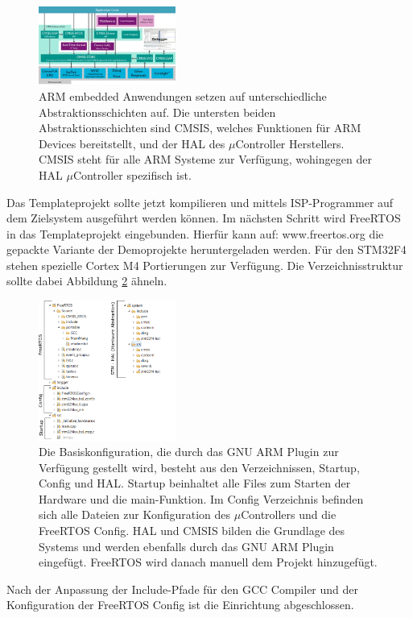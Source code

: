 \begin{figure}[htb]
	\centering
		\includegraphics[width=0.4\textwidth]{Pictures/Einrichtung/CMSISv4_small.jpg}
	\caption{ARM embedded Anwendungen setzen auf unterschiedliche Abstraktionsschichten auf. Die untersten beiden Abstraktionsschichten sind CMSIS, welches Funktionen für ARM Devices bereitstellt, und der HAL des $\mu$Controller Herstellers. CMSIS steht für alle ARM Systeme zur Verfügung, wohingegen der HAL $\mu$Controller spezifisch ist. }
	\label{fig:CMSIS}
\end{figure}
Das Templateprojekt sollte jetzt kompilieren und mittels ISP-Programmer auf dem Zielsystem ausgeführt werden können.
Im nächsten Schritt wird  \mbox{FreeRTOS} in das Templateprojekt eingebunden. Hierfür kann auf:\newline\newline
www.freertos.org 
\newline
\newline
die gepackte Variante der Demoprojekte heruntergeladen werden. Für den STM32F4 stehen spezielle Cortex M4 Portierungen zur Verfügung. Die Verzeichnisstruktur sollte dabei Abbildung \ref{fig:SourceTree} ähneln.
\begin{figure}[htb]
	\centering
		\includegraphics[width=0.4\textwidth]{Pictures/Einrichtung/sourceTree.png}
	\caption{Die Basiskonfiguration, die durch das GNU ARM Plugin zur Verfügung gestellt wird, besteht aus den Verzeichnissen,  Startup, Config und HAL. Startup beinhaltet alle Files zum Starten der Hardware und die main-Funktion. Im Config Verzeichnis befinden sich alle Dateien zur Konfiguration des $\mu$Controllers und die FreeRTOS Config. HAL und CMSIS bilden die Grundlage des Systems und werden ebenfalls durch das GNU ARM Plugin eingefügt. FreeRTOS wird danach manuell dem Projekt hinzugefügt.}
	\label{fig:SourceTree}
\end{figure}
Nach der Anpassung der Include-Pfade für den GCC Compiler und der Konfiguration der FreeRTOS Config ist die Einrichtung abgeschlossen.
